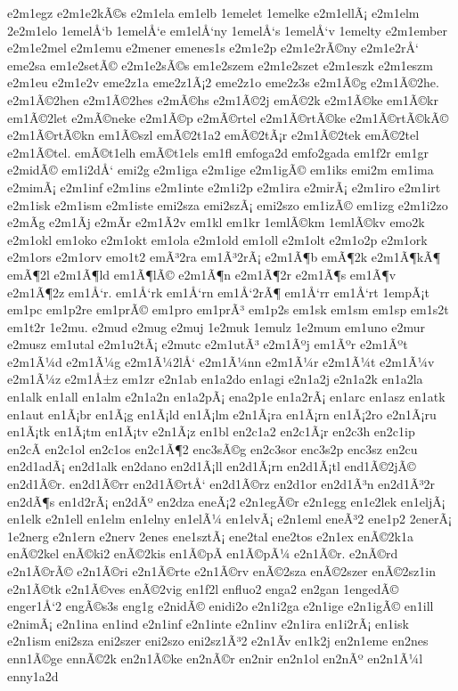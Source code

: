 {e2m1egz
e2m1e2kÃ©s
e2m1ela
em1elb
1emelet
1emelke
e2m1ellÃ¡
e2m1elm
2e2m1elo
1emelÅ‘b
1emelÅ‘e
em1elÅ‘ny
1emelÅ‘s
1emelÅ‘v
1emelty
e2m1ember
e2m1e2mel
e2m1emu
e2mener
emenes1s
e2m1e2p
e2m1e2rÃ©ny
e2m1e2rÅ‘
eme2sa
em1e2setÃ©
e2m1e2sÃ©s
em1e2szem
e2m1e2szet
e2m1eszk
e2m1eszm
e2m1eu
e2m1e2v
eme2z1a
eme2z1Ã¡2
eme2z1o
eme2z3s
e2m1Ã©g
e2m1Ã©2he.
e2m1Ã©2hen
e2m1Ã©2hes
e2mÃ©hs
e2m1Ã©2j
emÃ©2k
e2m1Ã©ke
em1Ã©kr
em1Ã©2let
e2mÃ©neke
e2m1Ã©p
e2mÃ©rtel
e2m1Ã©rtÃ©ke
e2m1Ã©rtÃ©kÃ©
e2m1Ã©rtÃ©kn
em1Ã©szl
emÃ©2t1a2
emÃ©2tÃ¡r
e2m1Ã©2tek
emÃ©2tel
e2m1Ã©tel.
emÃ©t1elh
emÃ©t1els
em1fl
emfoga2d
emfo2gada
em1f2r
em1gr
e2midÃ©
em1i2dÅ‘
emi2g
e2m1iga
e2m1ige
e2m1igÃ©
em1iks
emi2m
em1ima
e2mimÃ¡
e2m1inf
e2m1ins
e2m1inte
e2m1i2p
e2m1ira
e2mirÃ¡
e2m1iro
e2m1irt
e2m1isk
e2m1ism
e2m1iste
emi2sza
emi2szÃ¡
emi2szo
em1izÃ©
em1izg
e2m1i2zo
e2mÃ­g
e2m1Ã­j
e2mÃ­r
e2m1Ã­2v
em1kl
em1kr
1emlÃ©km
1emlÃ©kv
emo2k
e2m1okl
em1oko
e2m1okt
em1ola
e2m1old
em1oll
e2m1olt
e2m1o2p
e2m1ork
e2m1ors
e2m1orv
emo1t2
emÃ³2ra
em1Ã³2rÃ¡
e2m1Ã¶b
emÃ¶2k
e2m1Ã¶kÃ¶
emÃ¶2l
e2m1Ã¶ld
em1Ã¶lÃ©
e2m1Ã¶n
e2m1Ã¶2r
e2m1Ã¶s
em1Ã¶v
e2m1Ã¶2z
em1Å‘r.
em1Å‘rk
em1Å‘rn
em1Å‘2rÃ¶
em1Å‘rr
em1Å‘rt
1empÃ¡t
em1pc
em1p2re
em1prÃ©
em1pro
em1prÃ³
em1p2s
em1sk
em1sm
em1sp
em1s2t
em1t2r
1e2mu.
e2mud
e2mug
e2muj
1e2muk
1emulz
1e2mum
em1uno
e2mur
e2musz
em1utal
e2m1u2tÃ¡
e2mutc
e2m1utÃ³
e2m1Ãºj
em1Ãºr
e2m1Ãºt
e2m1Ã¼d
e2m1Ã¼g
e2m1Ã¼2lÅ‘
e2m1Ã¼nn
e2m1Ã¼r
e2m1Ã¼t
e2m1Ã¼v
e2m1Ã¼z
e2m1Å±z
em1zr
e2n1ab
en1a2do
en1agi
e2n1a2j
e2n1a2k
en1a2la
en1alk
en1all
en1alm
e2n1a2n
en1a2pÃ¡
ena2p1e
en1a2rÃ¡
en1arc
en1asz
en1atk
en1aut
en1Ã¡br
en1Ã¡g
en1Ã¡ld
en1Ã¡lm
e2n1Ã¡ra
en1Ã¡rn
en1Ã¡2ro
e2n1Ã¡ru
en1Ã¡tk
en1Ã¡tm
en1Ã¡tv
e2n1Ã¡z
en1bl
en2c1a2
en2c1Ã¡r
en2c3h
en2c1ip
en2cÃ­
en2c1ol
en2c1os
en2c1Ã¶2
enc3sÃ©g
en2c3sor
enc3s2p
enc3sz
en2cu
en2d1adÃ¡
en2d1alk
en2dano
en2d1Ã¡ll
en2d1Ã¡rn
en2d1Ã¡tl
end1Ã©2jÃ©
en2d1Ã©r.
en2d1Ã©rr
en2d1Ã©rtÅ‘
en2d1Ã©rz
en2d1or
en2d1Ã³n
en2d1Ã³2r
en2dÃ¶s
en1d2rÃ¡
en2dÃº
en2dza
eneÃ¡2
e2n1egÃ©r
e2n1egg
en1e2lek
en1eljÃ¡
en1elk
e2n1ell
en1elm
en1elny
en1elÃ¼
en1elvÃ¡
e2n1eml
eneÃ³2
ene1p2
2enerÃ¡
1e2nerg
e2n1ern
e2nerv
2enes
ene1sztÃ¡
ene2tal
ene2tos
e2n1ex
enÃ©2k1a
enÃ©2kel
enÃ©ki2
enÃ©2kis
en1Ã©pÃ­
en1Ã©pÃ¼
e2n1Ã©r.
e2nÃ©rd
e2n1Ã©rÃ©
e2n1Ã©ri
e2n1Ã©rte
e2n1Ã©rv
enÃ©2sza
enÃ©2szer
enÃ©2sz1in
e2n1Ã©tk
e2n1Ã©ves
enÃ©2vig
en1f2l
enfluo2
enga2
en2gan
1engedÃ©
enger1Å‘2
engÃ©s3s
eng1g
e2nidÃ©
enidi2o
e2n1i2ga
e2n1ige
e2n1igÃ©
en1ill
e2nimÃ¡
e2n1ina
en1ind
e2n1inf
e2n1inte
e2n1inv
e2n1ira
en1i2rÃ¡
en1isk
e2n1ism
eni2sza
eni2szer
eni2szo
eni2sz1Ã³2
e2n1Ã­v
en1k2j
en2n1eme
en2nes
enn1Ã©ge
ennÃ©2k
en2n1Ã©ke
en2nÃ©r
en2nir
en2n1ol
en2nÃº
en2n1Ã¼l
enny1a2d
}
